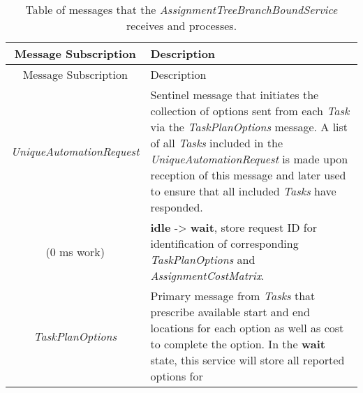 \begin{longtable}[]{@{}cl@{}}
\caption{Table of messages that the
\emph{AssignmentTreeBranchBoundService} receives and
processes.}\tabularnewline
\toprule
\begin{minipage}[b]{0.40\columnwidth}\centering\strut
Message Subscription\strut
\end{minipage} & \begin{minipage}[b]{0.55\columnwidth}\raggedright\strut
Description\strut
\end{minipage}\tabularnewline
\midrule
\endfirsthead
\toprule
\begin{minipage}[b]{0.40\columnwidth}\centering\strut
Message Subscription\strut
\end{minipage} & \begin{minipage}[b]{0.55\columnwidth}\raggedright\strut
Description\strut
\end{minipage}\tabularnewline
\midrule
\endhead
\begin{minipage}[t]{0.40\columnwidth}\centering\strut
\emph{UniqueAutomationRequest}\strut
\end{minipage} & \begin{minipage}[t]{0.55\columnwidth}\raggedright\strut
Sentinel message that initiates the collection of options sent from each
\emph{Task} via the \emph{TaskPlanOptions} message. A list of all
\emph{Tasks} included in the \emph{UniqueAutomationRequest} is made upon
reception of this message and later used to ensure that all included
\emph{Tasks} have responded.\strut
\end{minipage}\tabularnewline
\begin{minipage}[t]{0.40\columnwidth}\centering\strut
(0 ms work)\strut
\end{minipage} & \begin{minipage}[t]{0.55\columnwidth}\raggedright\strut
\textbf{idle} -\textgreater{} \textbf{wait}, store request ID for
identification of corresponding \emph{TaskPlanOptions} and
\emph{AssignmentCostMatrix}.\strut
\end{minipage}\tabularnewline
\begin{minipage}[t]{0.40\columnwidth}\centering\strut
\emph{TaskPlanOptions}\strut
\end{minipage} & \begin{minipage}[t]{0.55\columnwidth}\raggedright\strut
Primary message from \emph{Tasks} that prescribe available start and end
locations for each option as well as cost to complete the option. In the
\textbf{wait} state, this service will store all reported options for

\end{minipage}
\end{longtable}
